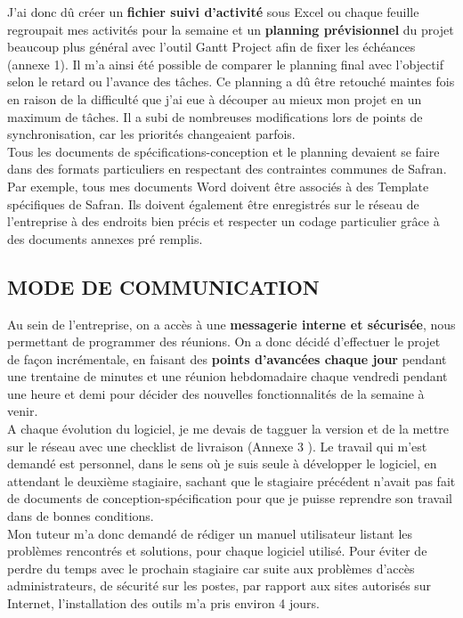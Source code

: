 J’ai donc dû créer un \textbf{fichier suivi d’activité} sous Excel ou chaque feuille regroupait mes activités pour la semaine et un \textbf{planning prévisionnel} du projet beaucoup plus général avec l’outil Gantt Project afin de fixer les échéances (annexe 1). Il m’a ainsi été possible de comparer le planning final avec l’objectif selon le retard ou l’avance des tâches. Ce planning a dû être retouché maintes fois en raison de la difficulté que j’ai eue à découper au mieux mon projet en un maximum de tâches. Il a subi de nombreuses modifications lors de points de synchronisation, car les priorités changeaient parfois.\\

Tous les documents de spécifications-conception et le planning devaient se faire dans des formats particuliers en respectant des contraintes communes de Safran. Par exemple, tous mes documents Word doivent être associés à des Template spécifiques de Safran. Ils doivent également être enregistrés sur le réseau de l’entreprise à des endroits bien précis et respecter un codage particulier grâce à des documents annexes pré remplis.\\

\subsection{MODE DE COMMUNICATION}

Au sein de l’entreprise, on a accès à une \textbf{messagerie interne et sécurisée}, nous permettant de programmer des réunions. On a donc décidé d’effectuer le projet de façon incrémentale, en faisant des \textbf{points d’avancées chaque jour} pendant une trentaine de minutes et une réunion hebdomadaire chaque vendredi pendant une heure et demi pour décider des nouvelles fonctionnalités de la semaine à venir.\\ 

A chaque évolution du logiciel, je me devais de tagguer la version et de la mettre sur le réseau avec une checklist de livraison (Annexe 3 ).
Le travail qui m’est demandé est personnel, dans le sens où je suis seule à développer le logiciel, en attendant le deuxième stagiaire, sachant que le stagiaire précédent n’avait pas fait de documents de conception-spécification pour que je puisse reprendre son travail dans de bonnes conditions.\\

Mon tuteur m’a donc demandé de rédiger un manuel utilisateur listant les problèmes rencontrés et solutions, pour chaque logiciel utilisé. Pour éviter de perdre du temps avec le prochain stagiaire car suite aux problèmes d’accès administrateurs, de sécurité sur les postes, par rapport aux sites autorisés sur Internet, l’installation des outils m’a pris environ 4 jours.\\

